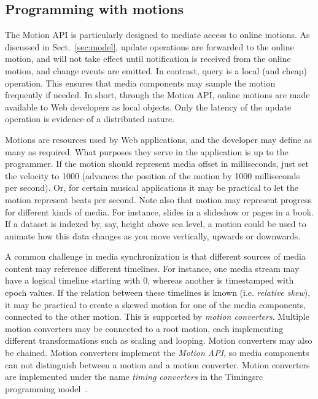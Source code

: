\subsection{Programming with motions}


The Motion API is particularly designed to mediate access to online motions.
As discussed in Sect.~\ref{sec:model}, update operations are forwarded to the
online motion, and will not take effect until notification is received from
the online motion, and change events are emitted. In contrast, query is a local
(and cheap) operation. This ensures that media components may sample the
motion frequently if needed. In short, through the Motion API, online motions
are made available to Web developers as local objects. Only the latency of the
update operation is evidence of a distributed nature.


Motions are resources used by Web applications, and the developer may define
as many as required. What purposes they serve in the application is up to the
programmer. If the motion should represent media offset in milliseconds, just
set the velocity to 1000 (advances the position of the motion by 1000
milliseconds per second). Or, for certain musical applications it may be
practical to let the motion represent beats per second. Note also that motion
may represent progress for different kinds of media. For instance, slides in a
slideshow or pages in a book. If a dataset is indexed by, say, height above
sea level, a motion could be used to animate how this data changes as you move
vertically, upwards or downwards.


A common challenge in media synchronization is that different sources of media
content may reference different timelines. For instance, one media stream may
have a logical timeline starting with 0, whereas another is timestamped with
epoch values. If the relation between these timelines is known (i.e. \emph{relative
skew}), it may be practical to create a skewed motion for one of the media
components, connected to the other motion. This is supported by \emph{motion
converters}. Multiple motion converters may be connected to a root motion, each
implementing different transformations such as scaling and looping. Motion
converters may also be chained. Motion converters implement the \emph{Motion API},
so media components can not distinguish between a motion and a motion
converter. Motion converters are implemented under the name \emph{timing converters}
in the Timingsrc programming model~\cite{timingsrc}.


